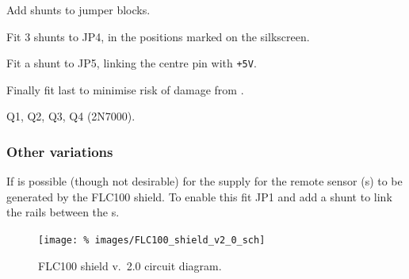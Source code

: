 Add shunts to jumper blocks.
\begin{buildorder*}
\item Fit 3 shunts to JP4, in the positions marked on the silkscreen.
\item Fit a shunt to JP5, linking the centre pin with \texttt{+5V}.
\end{buildorder*}


Finally fit last to minimise risk of damage from \esd.
\begin{buildorder*}
\item Q1, Q2, Q3, Q4 (2N7000).
\end{buildorder*}


\subsubsection{Other variations}
If is possible (though not desirable) for the  supply for the
remote sensor \pcb{}(s) to be generated by the FLC100 shield. To enable
this fit JP1 and add a shunt to link the  rails between the
\pcb{}s.


\begin{landscape}
  \begin{figure}[p]
    \centering
    \texttt{[image: \%
      images/FLC100\_shield\_v2\_0\_sch]}
    \caption{FLC100 shield v.~2.0 circuit diagram.}
    \label{fig:flc100-shield-v2.0-cct-diag}
  \end{figure}
\end{landscape}
